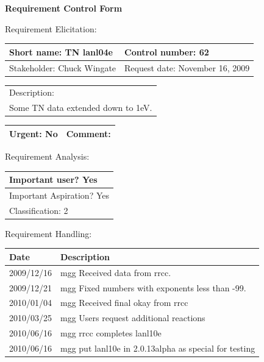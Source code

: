\begin{center}\Large\bf
Requirement Control Form
\end{center}
\vspace{24pt}

Requirement Elicitation:

\begin{tabular}{|p{211pt}|p{211pt}|} \hline
Short name: TN lanl04e & Control number: 62\\ \hline
Stakeholder: Chuck Wingate & Request date: November 16, 2009\\
\end{tabular}
\begin{tabular}{|p{433pt}|} \hline
Description: \\ 
Some TN data extended down to 1eV.\\
\hline
\end{tabular} 
\begin{tabular}{|p{211pt}|p{211pt}|} \hline
Urgent: No & Comment: \\ \hline
\end{tabular}

\vspace{24pt}

Requirement Analysis:

\begin{tabular}{|p{433pt}|} \hline
Important user? Yes \\ \hline
Important Aspiration? Yes \\ \hline
Classification: 2 \\ \hline
\end{tabular}
\vspace{24pt}

Requirement Handling:

\begin{tabular}{|p{72pt}|p{351pt}|} \hline
Date & Description \\ \hline
2009/12/16 & mgg Received data from rrcc. \\ \hline
2009/12/21 & mgg Fixed numbers with exponents less than -99. \\ \hline
2010/01/04 & mgg Received final okay from rrcc \\ \hline
2010/03/25 & mgg Users request additional reactions \\ \hline
2010/06/16 & mgg rrcc completes lanl10e \\ \hline
2010/06/16 & mgg put lanl10e in 2.0.13alpha as special for testing \\ \hline
\end{tabular}
